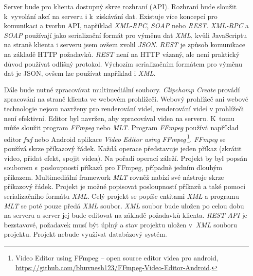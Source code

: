 Server bude pro klienta dostupný skrze rozhraní (API). Rozhraní bude sloužit k~vyvolání akcí na serveru i k~získávání dat. Existuje více koncepcí pro komunikaci a tvorbu API, například \textit{XML-RPC}, \textit{SOAP} nebo \textit{REST}. \textit{XML-RPC} a \textit{SOAP} používají jako serializační formát pro výměnu dat \textit{XML}, kvůli JavaScriptu na straně klienta i serveru jsem ovšem zvolil \textit{JSON}. \textit{REST} je způsob komunikace na základě HTTP požadavků. \textit{REST} není na HTTP vázaný, ale není praktický důvod používat odlišný protokol. Výchozím serializačním formátem pro výměnu dat je JSON, ovšem lze používat například i \textit{XML}.

Dále bude nutné zpracovávat multimediální soubory. \textit{Clipchamp Create} provádí zpracování na straně klienta ve webovém prohlížeči. Webový prohlížeč ani webové technologie nejsou navrženy pro renderování videí, renderování videí v prohlížeči není efektivní. Editor byl navržen, aby zpracovával videa na serveru. K~tomu může sloužit program \textit{FFmpeg} nebo \textit{MLT}. Program \textit{FFmpeg} používá například editor \textit{fwf} nebo Android aplikace \textit{Video Editor using FFmpeg}\,\footnote{Video Editor using FFmpeg -- open source editor videa pro android, \url{https://github.com/bhuvnesh123/FFmpeg-Video-Editor-Android}.}. \textit{FFmpeg} se používá skrze příkazový řádek. Každá operace představuje jeden příkaz (zkrátit video, přidat efekt, spojit videa). Na pořadí operací záleží. Projekt by byl popsán souborem s~posloupností příkazů pro FFmpeg, případně jedním dlouhým příkazem. Multimediální framework \textit{MLT} rovněž nabízí své nástroje skrze příkazový řádek. Projekt je možné popisovat posloupností příkazů a také pomocí serializačního formátu \textit{XML}. Celý projekt se popíše entitami \textit{XML} a programu \textit{MLT} se poté pouze předá \textit{XML} soubor. \textit{XML} soubor bude uložen po celou dobu na serveru a server jej bude editovat na základě požadavků klienta. \textit{REST API} je bezstavové, požadavek musí být úplný a stav projektu uložen v~\textit{XML} souboru projektu. Projekt nebude využívat databázový systém.


